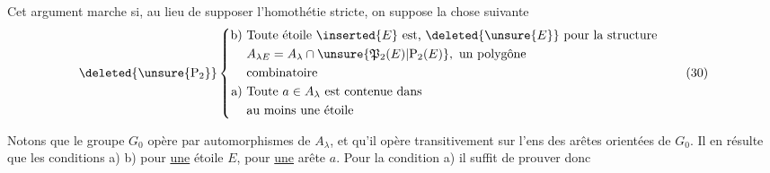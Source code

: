 Cet argument marche si, au lieu de supposer l'homothétie stricte, on suppose la chose suivante
\[
\deleted{\unsure{\mathrm P_2}}\left\{\begin{aligned}
\text{b)}\ &\text{Toute étoile }\inserted{E}\text{ est, }\deleted{\unsure{E}}\text{ pour la structure}\\
&A_{\lambda E}=A_\lambda\cap\unsure{\mathfrak P_2(E)|\mathrm P_2(E)},\ \text{un polygône}\\
&\text{combinatoire}\\
\text{a)}\ &\text{Toute }a\in A_\lambda\text{ est contenue dans}\\
&\text{au moins une étoile}
\end{aligned}\right.\tag*{(30)}
\]
\noindent{}

Notons que le groupe $G_0$ opère par automorphismes de $A_\lambda$, et qu'il opère transitivement sur l'ens des arêtes orientées de $G_0$. Il en résulte que  les conditions a) b) pour \uline{une} étoile $E$, pour \uline{une} arête $a$.  Pour la condition a) il suffit de prouver donc

